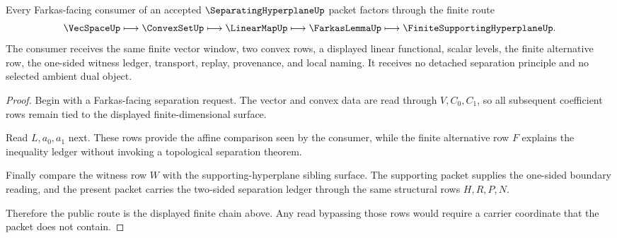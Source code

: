 \begin{theorem}
\label{thm:separating-hyperplane-farkas-route}
Every Farkas-facing consumer of an accepted $\SeparatingHyperplaneUp$ packet factors through the finite route
$$
\VecSpaceUp \longmapsto \ConvexSetUp \longmapsto \LinearMapUp \longmapsto \FarkasLemmaUp \longmapsto \FiniteSupportingHyperplaneUp .
$$
The consumer receives the same finite vector window, two convex rows, a displayed linear functional, scalar levels, the finite alternative row, the one-sided witness ledger, transport, replay, provenance, and local naming. It receives no detached separation principle and no selected ambient dual object.
\end{theorem}
\begin{proof}
Begin with a Farkas-facing separation request. The vector and convex data are read through $V,C_0,C_1$, so all subsequent coefficient rows remain tied to the displayed finite-dimensional surface.

Read $L,a_0,a_1$ next. These rows provide the affine comparison seen by the consumer, while the finite alternative row $F$ explains the inequality ledger without invoking a topological separation theorem.

Finally compare the witness row $W$ with the supporting-hyperplane sibling surface. The supporting packet supplies the one-sided boundary reading, and the present packet carries the two-sided separation ledger through the same structural rows $H,R,P,N$.

Therefore the public route is the displayed finite chain above. Any read bypassing those rows would require a carrier coordinate that the packet does not contain.
\end{proof}


\begin{closurestatus}{\SeparatingHyperplaneUp}
  \theoryclosure{\seedClosure}
  \formalstatus{\unformalizedV}
\end{closurestatus}
